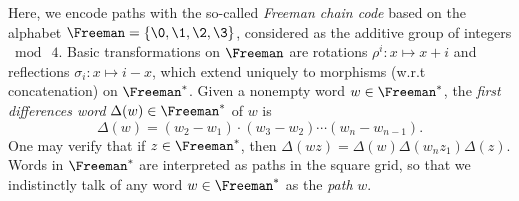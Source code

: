 Here, we encode paths with the so-called \emph{Freeman chain code}\cite{freeman1} based on the  alphabet $\Freeman=\{\0,\1,\2,\3\}$, considered as the additive group of integers $\bmod~4$. 
Basic transformations on $\Freeman$ are rotations $\rho^i:x\mapsto x+i$ and reflections $\sigma_i:x\mapsto i - x$,  which extend uniquely to morphisms (w.r.t  concatenation) on $\Freeman^*$. 
Given a nonempty word $w\in\Freeman^*$, the \emph{first differences word} $\Delta(w)\in\Freeman^*$ of $w$ is
\begin{equation}\label{Delta}
\Delta(w) = (w_2-w_1)\cdot (w_3-w_2) \cdots (w_n - w_{n-1}).
\end{equation}
One may verify that if $z \in\Freeman^*$, then $\Delta(wz)=\Delta(w)\Delta (w_nz_1)\Delta(z)$.
Words in $\Freeman^*$ are interpreted as paths in the square grid, so that we indistinctly talk of any word $w\in\Freeman^*$ as the \emph{path} $w$. 
